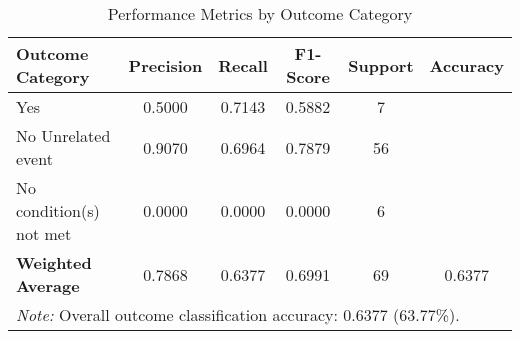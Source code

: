 \begin{table}[H]
\centering
\caption{Performance Metrics by Outcome Category}
\label{tab:classification_metrics}
\begin{tabular}{lccccc}
\toprule
\textbf{Outcome Category} & \textbf{Precision} & \textbf{Recall} & \textbf{F1-Score} & \textbf{Support} & \textbf{Accuracy} \\
\midrule
Yes & 0.5000 & 0.7143 & 0.5882 & 7 & \multirow{1}{*}{} \\
No \- Unrelated event & 0.9070 & 0.6964 & 0.7879 & 56 & \multirow{1}{*}{} \\
No \- condition(s) not met & 0.0000 & 0.0000 & 0.0000 & 6 & \multirow{1}{*}{} \\
\midrule
\textbf{Weighted Average} & 0.7868 & 0.6377 & 0.6991 & 69 & 0.6377 \\
\bottomrule
\multicolumn{6}{p{14cm}}{\textit{Note:} Overall outcome classification accuracy: 0.6377 (63.77\%).} \\
\end{tabular}
\end{table}
